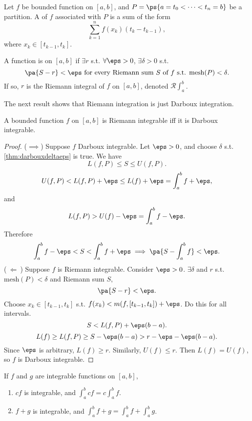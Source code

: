 \documentclass[11pt]{scrartcl}
\numberwithin{equation}{section}
\begin{document}
\begin{definition}
    Let $f$ be bounded function on $[a,b]$, and $P=\ps{a=t_0<\cdots<t_n=b}$
    be a partition. A  of $f$ associated with $P$
    is a sum of the form 
    \[
        \sum_{k=1}^{n}f(x_k)(t_k-t_{k-1}),
    \]
    where $x_k\in[t_{k-1},t_k]$.

    A function is  on $[a,b]$ if $\exists r$
    s.t. $\forall \eps>0$, $\exists \delta>0$ s.t.
    \[
        \pa{S-r}<\eps \text{ for every Riemann sum $S$ of $f$ s.t. $\mathrm{mesh}(P)<\delta$}.
    \]
    If so, $r$ is the Riemann integral of $f$ on $[a,b]$, denoted 
    $\mathscr{R}\int_a^b$.
\end{definition}
The next result shows that Riemann integration is just 
Darboux integration.

\begin{theorem}
    A bounded function $f$ on $[a,b]$ is Riemann integrable iff it is Darboux integrable.
\end{theorem}

\begin{proof}
    ($\implies$) 
    Suppose $f$ Darboux integrable. Let $\eps>0$, and choose $\delta$ s.t.
    \cref{thm:darbouxdeltaeps} is true.
    We have 
    \[
        L(f,P) \leq S \leq U(f,P).
    \]
    \[
        U(f,P) < L(f,P)+\eps \leq L(f)+\eps = \int_a^b f + \eps,
    \]
    and 
    \[
        L(f,P) > U(f)-\eps = \int_a^b f - \eps.
    \]
    Therefore 
    \[
        \int_a^b f -\eps < S < \int_a^b f+ \eps \implies \pa{S - \int_a^bf}< \eps.
    \]
    ($\ \Longleftarrow\ $) Suppose $f$ is Riemann integrable. Consider $\eps>0$. $\exists \delta$ and $r$ s.t. $\mathrm{mesh}(P)<\delta$
    and Riemann sum $S$, 
    \[
        \pa{S-r}<\eps.
    \]
    Choose $x_k \in [t_{k-1},t_k]$ s.t. $f(x_k) < m(f, [t_{k-1}, t_k]) + \eps$. Do this for all intervals.
    \[
        S < L(f,P) + \eps(b-a).
    \]
    \[
        L(f) \geq L(f,P) \geq S - \eps(b-a) > r-\eps-\eps(b-a).
    \]
    Since $\eps$ is arbitrary, $L(f)\geq r$. Similarly, $U(f)\leq r$.
    Then $L(f)=U(f)$, so $f$ is Darboux integrable.
\end{proof}

\begin{proposition}
    \label{prop:riemannintegrationprop}
    If $f$ and $g$ are integrable functions on $[a,b]$,
    \begin{enumerate}
        \item $cf$ is integrable, and $\int_a^b cf = c\int_a^b f$.
        \item $f+g$ is integrable, and $\int_a^b f+g = \int_a^b f+\int_a^b g$.
    \end{enumerate}
\end{proposition}
\end{document}
